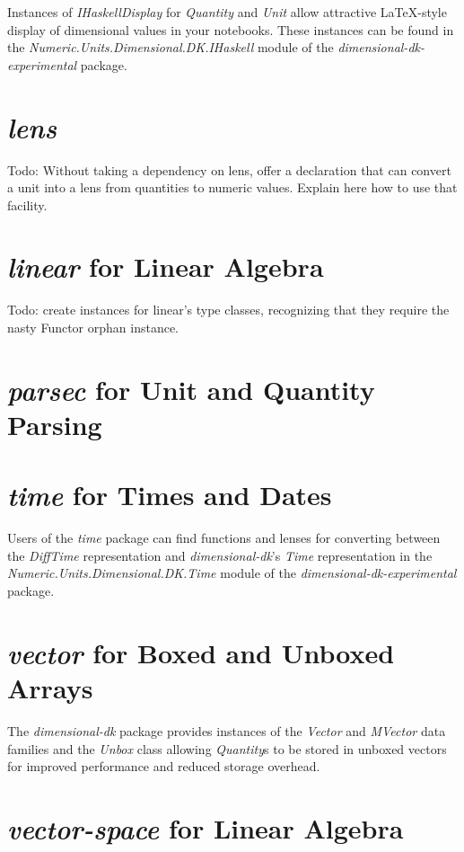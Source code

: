 \documentclass[12pt]{report}
\newcommand{\packagename}[1]{\textit{#1}}
\newcommand{\thispackage}{\packagename{dimensional-dk}}
\newcommand{\experimentalpackage}{\packagename{dimensional-dk-experimental}}
\newcommand{\classname}[1]{\textit{#1}}
\newcommand{\typename}[1]{\textit{#1}}
\newcommand{\modulename}[1]{\textit{#1}}
\newcommand{\submodule}[1]{\modulename{Numeric.Units.Dimensional.DK.{#1}}}
\begin{document}
Instances of \classname{IHaskellDisplay} for \typename{Quantity} and \typename{Unit}
allow attractive \LaTeX{}-style display of dimensional values in your notebooks. These
instances can be found in the \submodule{IHaskell} module of the \experimentalpackage{}
package.

\section{\packagename{lens}}

Todo: Without taking a dependency on lens, offer a declaration that can convert a unit into a lens from quantities to numeric values.
Explain here how to use that facility.

\section{\packagename{linear} for Linear Algebra}

Todo: create instances for linear's type classes, recognizing that they require the nasty Functor orphan instance.

\section{\packagename{parsec} for Unit and Quantity Parsing}
\section{\packagename{time} for Times and Dates}

Users of the \packagename{time} package can find functions and lenses for converting
between the \typename{DiffTime} representation and \thispackage{}'s \typename{Time} representation in the
\submodule{Time} module of the \experimentalpackage{} package.

\section{\packagename{vector} for Boxed and Unboxed Arrays}

The \thispackage{} package provides instances of the \typename{Vector} and \typename{MVector} data families and the \classname{Unbox} class
allowing \typename{Quantity}s to be stored in unboxed vectors for improved performance and reduced storage overhead.

\section{\packagename{vector-space} for Linear Algebra}
\end{document}
